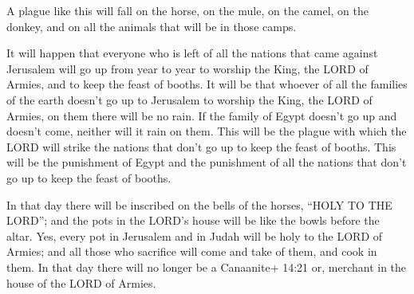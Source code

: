  A plague like this will fall on the horse, on the mule, on
the camel, on the donkey, and on all the animals that will be in those
camps.

 It will happen that everyone who is left of all the
nations that came against Jerusalem will go up from year to year to
worship the King, the LORD of Armies, and to keep the feast of booths.
 It will be that whoever of all the families of the earth
doesn't go up to Jerusalem to worship the King, the LORD of Armies, on
them there will be no rain.  If the family of Egypt doesn't
go up and doesn't come, neither will it rain on them. This will be the
plague with which the LORD will strike the nations that don't go up to
keep the feast of booths.  This will be the punishment of
Egypt and the punishment of all the nations that don't go up to keep the
feast of booths.

 In that day there will be inscribed on the bells of the
horses, ``HOLY TO THE LORD''; and the pots in the LORD's house will be
like the bowls before the altar.  Yes, every pot in
Jerusalem and in Judah will be holy to the LORD of Armies; and all those
who sacrifice will come and take of them, and cook in them. In that day
there will no longer be a Canaanite+ 14:21 or, merchant in the house of
the LORD of Armies.
